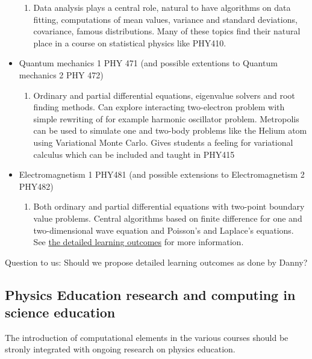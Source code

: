 \documentclass[%
oneside,                 %
final,                   %
10pt]{article}
\begin{document}
\begin{itemize}
\begin{enumerate}
  \item Data analysis plays a central role, natural to have algorithms on data fitting, computations  of mean values, variance and standard deviations, covariance, famous distributions. Many of these topics find their natural place in a course on statistical physics like PHY410.  

\end{enumerate}

\noindent
 \item Quantum mechanics 1  PHY 471 (and possible extentions to Quantum mechanics 2 PHY 472)
\begin{enumerate}

  \item Ordinary and partial differential equations, eigenvalue solvers and root finding methods. Can explore interacting two-electron problem with simple rewriting of for example harmonic oscillator problem. Metropolis can be used to simulate one and two-body problems like the Helium atom using Variational Monte Carlo. Gives students a feeling for variational calculus which can be included and  taught in PHY415

\end{enumerate}

\noindent
 \item Electromagnetism 1 PHY481 (and possible extensions to Electromagnetism 2 PHY482)
\begin{enumerate}

  \item Both ordinary and partial differential equations with two-point boundary value problems. Central algorithms based on finite difference for one and two-dimensional wave equation and Poisson's and Laplace's equations. See \href{{https://dannycab.github.io/phy481msu/learning_goals.html}}{the detailed learning outcomes} for more information.
\end{enumerate}

\noindent
\end{itemize}

\noindent
Question to us: Should we propose detailed learning outcomes as done by Danny? 




\subsection*{Physics Education research and computing in science education}

The introduction of computational elements in the various courses should be stronly integrated with ongoing research on physics education.
\end{document}
